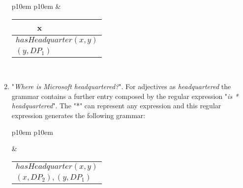 \begin{enumerate}
\begin{center}
\begin{tabular}{ p{10em} p{10em} }
	&

	\begin{center}
		\begin{tabular}{|c|l|}
			\hline
			x & \mbox{}\\
			\hline
			\multicolumn{2}{|l|}{
				$hasHeadquarter(x,y)$
			} \\
			\hline
			\multicolumn{2}{|l|}{
				$(y,DP_{1})$
			} \\
			\hline
		\end{tabular}
	\end{center}	
	\\
\end{tabular}
\end{center}
\medskip
\item "\textit{Where is Microsoft headquartered?}". For adjectives as \textit{headquartered} the grammar contains a further entry composed by the regular expression "\textit{is * headquartered}". The "*" can represent any expression and this regular expression generates the following grammar:
\medskip
\begin{center}
\begin{tabular}{ p{10em} p{10em} }
	\label{tbl:grammar.is*headquartered}
	
	\begin{center}
		\begin{tikzpicture}
		\Tree [.S [.DP$_1^\downarrow$ ] [.VP [.V is ] DP$_2^\downarrow$ [.PV headquartered ] ] ]	
		\end{tikzpicture}
	\end{center}
	
	&

	\begin{center}
		\begin{tabular}{|c|l|}
			\hline
			\mbox{} & \mbox{}\\
			\hline
			\multicolumn{2}{|l|}{
				$hasHeadquarter(x,y)$
			} \\
			\hline
			\multicolumn{2}{|l|}{
				$(x, DP_{2}),(y,DP_{1})$
			} \\
			\hline
		\end{tabular}
	\end{center}	
	\\
\end{tabular}
\end{center}
\medskip
\end{enumerate}


